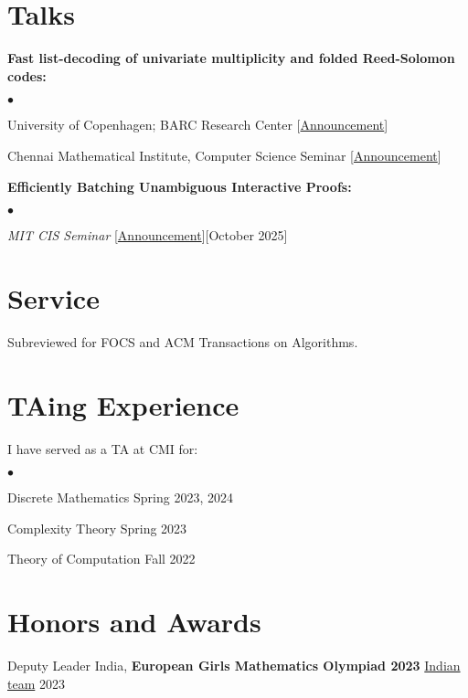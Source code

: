 \documentclass[margin,line, 10pt]{res}
\newenvironment{list2}{
  \begin{list}{$\bullet$}{%
      \setlength{\itemsep}{0in}
      \setlength{\parsep}{0in} \setlength{\parskip}{0in}
      \setlength{\topsep}{0in} \setlength{\partopsep}{0in} 
      \setlength{\leftmargin}{0.2in}}}{\end{list}}
\begin{document}
\begin{resume}
\section{Talks}
{\bf Fast list-decoding of univariate multiplicity and folded Reed-Solomon codes:}
\begin{list2}
    \item University of Copenhagen; BARC Research Center \hfill [\href{https://barc.ku.dk/events/barc-talk-by-rohan-goyal/}{Announcement}]
    \item Chennai Mathematical Institute, Computer Science Seminar \hfill [\href{https://www.cmi.ac.in/activities/show-abstract.php?absyear=2025&absref=3&abstype=sem}{Announcement}]
\end{list2}

{\bf Efficiently Batching Unambiguous Interactive Proofs:}
\begin{list2}
    \item \textit{MIT CIS Seminar} [\href{https://cis.csail.mit.edu/}{Announcement}]{\hfill [October 2025]}
\end{list2}

\section{Service}
Subreviewed for FOCS and ACM Transactions on Algorithms.



\section{TAing Experience}
I have served as a TA at CMI for:
\begin{list2}
    \item Discrete Mathematics \hfill Spring 2023, 2024
    \item Complexity Theory \hfill Spring 2023
    \item Theory of Computation \hfill Fall 2022
\end{list2}

\section{\sc Honors and Awards} 

Deputy Leader India, {\bf European Girls Mathematics Olympiad 2023} \href{https://www.egmo.org/egmos/egmo12/countries/country35/}{Indian team} \hfill 2023


\end{resume}
\end{document}
